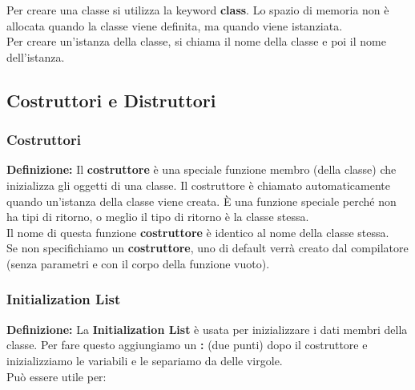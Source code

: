 \textsf{\small Per creare una classe si utilizza la keyword \textbf{class}. Lo spazio di memoria non è allocata quando la classe viene definita, ma quando viene istanziata. } \\

\textsf{\small Per creare un'istanza della classe, si chiama il nome della classe e poi il nome dell'istanza.} \\

\subsection{Costruttori e Distruttori}

\subsubsection{Costruttori}

\textsf{\small \textbf{Definizione: } Il \textbf{costruttore} è una speciale funzione membro (della classe) che inizializza gli oggetti di una classe. Il costruttore è chiamato automaticamente quando un'istanza della classe viene creata. È una funzione speciale perché non ha tipi di ritorno, o meglio il tipo di ritorno è la classe stessa. } \\ %

\textsf{\small Il nome di questa funzione \textbf{costruttore} è identico al nome della classe stessa.} \\

\textsf{\small Se non specifichiamo un \textbf{costruttore}, uno di default verrà creato dal compilatore (senza parametri e con il corpo della funzione vuoto).} \\

\subsubsection{Initialization List}

\textsf{\small \textbf{Definizione: } La \textbf{Initialization List} è usata per inizializzare i dati membri della classe. Per fare questo aggiungiamo un \textbf{:} (due punti) dopo il costruttore e inizializziamo le variabili e le separiamo da delle virgole.} \\

\textsf{\small Può essere utile per:}

